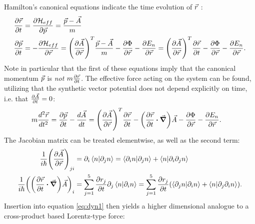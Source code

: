 \documentclass[a4paper]{article}
\begin{document}
Hamilton's canonical equations indicate the time evolution of \(\vec{r}\) :%
\begin{align*} %
        \frac{\partial \va{r}}{\partial t} &= \frac{\partial \mathbb{\cal H}_{eff}}{\partial \va{p}} = \frac{\va{p} -
 \va{A}}{m}\\ %
                \frac{\partial \va{p}}{\partial t}  &= -\frac{\partial \mathbb{\cal H}_{eff}}{\partial \va{r}}=
                \pqty{\frac{\partial
 \va{A}}{\partial \va{r}}}^T \frac{\va{p}-\va{A}}{m} -\frac{\partial \Phi}{\partial \va{r}}
 -\frac{\partial E_n}{\partial \va{r}} = \pqty{\frac{\partial
 \va{A}}{\partial \va{r}}}^T \frac{\partial \va{r}}{\partial t} - \frac{\partial
\Phi}{\partial \va{r}} - \frac{\partial E_n}{\partial \va{r}}  
.\end{align*}
Note in particular that the first of these equations imply that the canonical momentum \(\vec{p}\) is
\textit{not} \(m \frac{\partial \vec{r}}{\partial t} \). The effective force acting on the
system can be found, utilizing that the synthetic vector potential does not depend explicitly
on time, i.e. that \(\frac{\partial \vec{A}}{\partial t}  = 0\):
\begin{align}\label{eq:dyn1}
        m \frac{d^2 \va{r}}{d t^2} &= \frac{\partial \va{p}}{\partial
        t} - \frac{d \va{A}}{d t}  = \pqty{\frac{\partial \va{A}}{\partial \va{r}}}^T \frac{\partial
\va{r}}{\partial t} - \pqty{\frac{\partial \va{r}}{\partial t}  \vdot \grad}\va{A}
-\frac{\partial \Phi}{\partial \va{r}} - \frac{\partial E_n}{\partial \va{r}}  
.\end{align}
The Jacobian matrix can be treated elementwise, as well as the second term: 
\begin{align*}
        \frac{1}{i\hbar{}}\pqty{\frac{\partial \va{A}}{\partial \va{r}}}_{ji} &= \partial_i
        \bra{n}\ket{\partial_j n} = \bra{\partial_i n}\ket{\partial_j n} +
        \bra{n}\ket{\partial_i \partial_j n}\\
        \frac{1}{i\hbar{}}\pqty{\pqty{\frac{\partial \va{r}}{\partial t} \vdot \grad}
\va{A}}_i &= \sum_{j=1}^{5} \frac{\partial r_j}{\partial t} \partial_j
                \bra{n}\ket{\partial_i n} =\sum_{j=1}^{5}  \frac{\partial r_j}{\partial
                        t}\pqty{ \bra{\partial_j
                n}\ket{\partial_i n} + \bra{n}\ket{\partial_j \partial_i n}}
.\end{align*}
Insertion into equation \ref{eq:dyn1} then yields a higher dimensional analogue to a
cross-product based Lorentz-type force:
\end{document}
